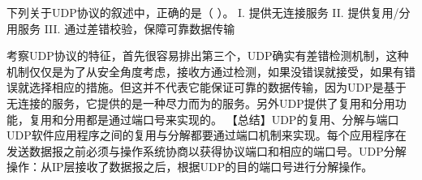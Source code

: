 \question 下列关于UDP协议的叙述中，正确的是（ ）。 I. 提供无连接服务 II.
提供复用/分用服务 III. 通过差错校验，保障可靠数据传输
\par{}
\begin{solution}考察UDP协议的特征，首先很容易排出第三个，UDP确实有差错检测机制，这种机制仅仅是为了从安全角度考虑，接收方通过检测，如果没错误就接受，如果有错误就选择相应的措施。但这并不代表它能保证可靠的数据传输，因为UDP是基于无连接的服务，它提供的是一种尽力而为的服务。另外UDP提供了复用和分用功能，复用和分用都是通过端口号来实现的。
【总结】UDP的复用、分解与端口UDP软件应用程序之间的复用与分解都要通过端口机制来实现。每个应用程序在发送数据报之前必须与操作系统协商以获得协议端口和相应的端口号。UDP分解操作：从IP层接收了数据报之后，根据UDP的目的端口号进行分解操作。
\end{solution}
